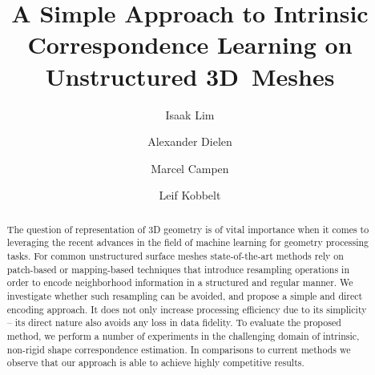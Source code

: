 \documentclass[runningheads]{llncs}
\begin{document}
\pagestyle{headings}
\mainmatter

\title{A Simple Approach to Intrinsic Correspondence Learning on Unstructured 3D~Meshes} %



\author{Isaak Lim \and Alexander Dielen \and Marcel Campen \and Leif Kobbelt}



\maketitle

\begin{abstract}
The question of representation of 3D geometry is of vital importance when it comes to leveraging the recent advances in the field of machine learning for geometry processing tasks. For common unstructured surface meshes state-of-the-art methods rely on patch-based or mapping-based techniques that introduce  resampling operations in order to encode neighborhood information in a structured and regular manner. We investigate whether such resampling can be avoided, and propose a simple and direct encoding approach. It does not only increase processing efficiency due to its simplicity -- its direct nature also avoids any loss in data fidelity. To evaluate the proposed method, we perform a number of experiments in the challenging domain of intrinsic, non-rigid shape correspondence estimation. In comparisons to current methods we observe that our approach is able to achieve highly competitive results.



\end{abstract}
\end{document}
